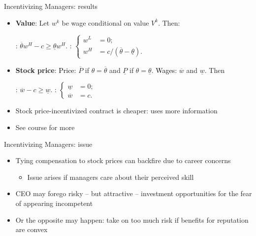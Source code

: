\documentclass[english,10pt
,aspectratio=169
]{beamer}
\begin{document}
\begin{frame}{Incentivizing Managers: results}
	\begin{itemize}
		\item \textbf{Value}: Let $w^{k}$ be wage conditional on  value $V^{k}$. Then:
		\smallskip
		\begin{center}
			: $ \overline{\theta} w^{H} - c \geq \underline{\theta} w^{H}$. 
			\bigskip
			:
			$ \displaystyle
			\left\{
			\begin{aligned}
			w^{L} 	& = 0; \\
			w^{H}	& = c/(\overline{\theta}-\underline{\theta}).
			\end{aligned}
			\right.
			$
		\end{center}
		\smallskip
		\item \textbf{Stock price}: \textcolor{black}{Price}: $\overline{P}$ if $\theta=\overline{\theta}$ and $\underline{P}$ if $\theta=\underline{\theta}$. \textcolor{black}{Wages}: $\overline{w}$ and $\underline{w}$. Then
		\smallskip 
		\begin{center}
			: $\overline{w}-c \geq \underline{w}$. 
			\bigskip
			:
			$ \displaystyle
			\left\{
			\begin{aligned}
			\underline{w} 	& = 0; \\
			\overline{w}	& = c.
			\end{aligned}
			\right.
			$
		\end{center}
		\smallskip 
		\item Stock price-incentivized contract is cheaper: uses more information
		\item See  course for more
	\end{itemize}
\end{frame}


\begin{frame}{Incentivizing Managers: issue}
	\begin{itemize}
		\item Tying compensation to stock prices can backfire due to \alert{career concerns}
		\begin{itemize}
			\item Issue arises if managers care about their perceived skill
		\end{itemize}
		\item CEO may forego risky -- but attractive -- investment opportunities for the fear of appearing incompetent
		\item Or the opposite may happen: take on too much risk if benefits for reputation are convex
	\end{itemize}
\end{frame}
\end{document}
